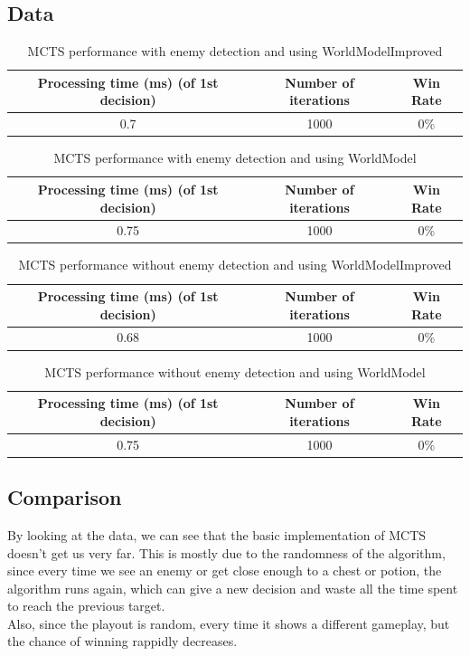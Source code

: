 \documentclass{article}
\begin{document}
  \subsection{Data}
  \begin{table}[h!]
    \centering
    \caption{MCTS performance with enemy detection and using WorldModelImproved}
    \label{tab:tableMCTS1}
    \begin{tabular}{c|c|c}
      \textbf{Processing time (ms) (of 1st decision)} & \textbf{Number of iterations} & \textbf{Win Rate}\\
      \hline
      0.7 & 1000 & 0\%
    \end{tabular}
  \end{table}
  \begin{table}[h!]
    \centering
    \caption{MCTS performance with enemy detection and using WorldModel}
    \label{tab:tableMCTS2}
    \begin{tabular}{c|c|c}
      \textbf{Processing time (ms) (of 1st decision)} & \textbf{Number of iterations} & \textbf{Win Rate}\\
      \hline
      0.75 & 1000 & 0\%
    \end{tabular}
  \end{table}
  \begin{table}[h!]
    \centering
    \caption{MCTS performance without enemy detection and using WorldModelImproved}
    \label{tab:tableMCTS3}
    \begin{tabular}{c|c|c}
      \textbf{Processing time (ms) (of 1st decision)} & \textbf{Number of iterations} & \textbf{Win Rate}\\
      \hline
      0.68 & 1000 & 0\%
    \end{tabular}
  \end{table}
  \begin{table}[h!]
    \centering
    \caption{MCTS performance without enemy detection and using WorldModel}
    \label{tab:tableMCTS4}
    \begin{tabular}{c|c|c}
      \textbf{Processing time (ms) (of 1st decision)} & \textbf{Number of iterations} & \textbf{Win Rate}\\
      \hline
      0.75 & 1000 & 0\%
    \end{tabular}
  \end{table}

  \subsection{Comparison}
  By looking at the data, we can see that the basic implementation of MCTS doesn't get us very far. This is mostly due to the randomness of the algorithm, 
  since every time we see an enemy or get close enough to a chest or potion, the algorithm runs again, which can give a new decision and waste all 
  the time spent to reach the previous target.\\
  Also, since the playout is random, every time it shows a different gameplay, but the chance of winning rappidly decreases.
\end{document}
